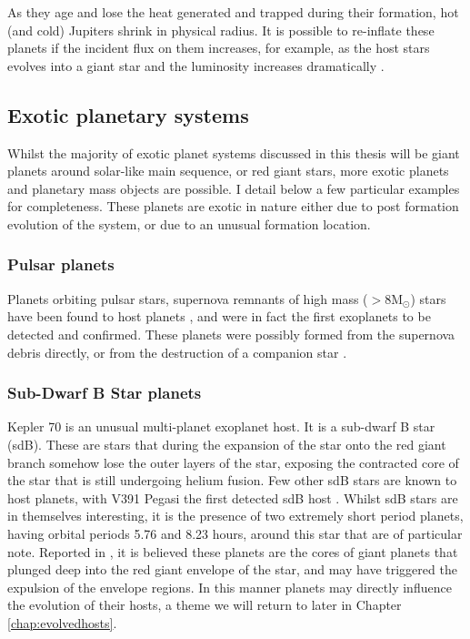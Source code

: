 As they age and lose the heat generated and trapped during their formation, hot (and cold) Jupiters shrink in physical radius. It is possible to re-inflate these planets if the incident flux on them increases, for example, as the host stars evolves into a giant star and the luminosity increases dramatically \citep{2015Lopez,2016Grunblatt,2017Grunblatt}. 

\subsection{Exotic planetary systems}\label{sec:exotic_planets}
Whilst the majority of exotic planet systems discussed in this thesis will be giant planets around solar-like main sequence, or red giant stars, more exotic planets and planetary mass objects are possible. I detail below a few particular examples for completeness. These planets are exotic in nature either due to post formation evolution of the system, or due to an unusual formation location.

\subsubsection{Pulsar planets}
Planets orbiting pulsar stars, supernova remnants of high mass ($>8\textrm{M}_{\odot}$) stars have been found to host planets  \citep{1992PulsarPlanet}, and were in fact the first exoplanets to be detected and confirmed. These planets were possibly formed from the supernova debris directly, or from the destruction of a companion star \citep{2011Bailes}.

\subsubsection{Sub-Dwarf B Star planets }
Kepler 70 is an unusual multi-planet exoplanet host. It is a sub-dwarf B star (sdB). These are stars that during the expansion of the star onto the red giant branch somehow lose the outer layers of the star, exposing the contracted core of the star that is still undergoing helium fusion. Few other sdB stars are known to host planets, with V391 Pegasi the first detected sdB host \citep{2007Silvotti}. Whilst sdB stars are in themselves interesting, it is the presence of two extremely short period planets, having orbital periods 5.76 and 8.23 hours, around this star that are of particular note. Reported in \cite{kep70}, it is believed these planets are the cores of giant planets that plunged deep into the red giant envelope of the star, and may have triggered the expulsion of the envelope regions. In this manner planets may directly influence the evolution of their hosts, a theme we will return to later in Chapter \ref{chap:evolvedhosts}.

